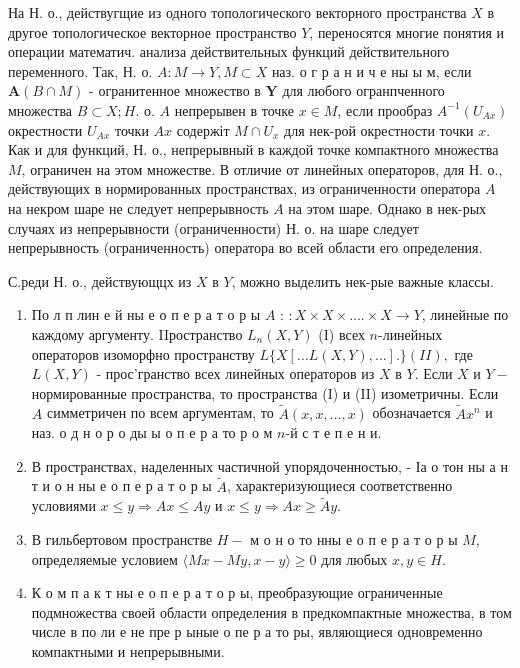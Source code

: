 \documentclass[10pt]{article}
\begin{document}
На Н. о., действугщие из одного топологического векторного пространства $X$ в другое топологическое векторное пространство $Y$, переносятся многие понятия и операции математич. анализа действительных функций действительного переменного. Так, Н. $о$. $A: M \rightarrow Y, M \subset X$ наз. о г р а н и ч е ны ы м, если $\boldsymbol{A}(B \cap M)$ - огранитенное множество в $\boldsymbol{Y}$ для любого огранпченного множества $B \subset X ; H$. о. $A$ непрерывен в точке $x \in M$, если прообраз $A^{-1}\left(U_{A x}\right)$ окрестности $U_{A x}$ точки $A x$ содержіт $M \cap U_{x}$ для нек-рой окрестности точки $x$. Как и для функций, Н. о., непрерывный в каждой точке компактного множества $M$, ограничен на этом множестве. В отличие от линейных операторов, для Н. о., действующих в нормированных пространствах, из ограниченности оператора $A$ на некром шаре не следует непрерывность $A$ на этом шаре. Однако в нек-рых случаях из непрерывности (ограниченности) Н. о. на шаре следует непрерывность (ограниченность) оператора во всей области его определения.



С.реди Н. о., действующцх из $X$ в $Y$, можно выделить нек-рые важные классы.



\begin{enumerate}

  \item По л п лин е й ны е о п е р а т о р ы $A$ : $: X \times X \times \ldots . \times X \rightarrow Y$, линейные по каждому аргументу. IIространство $L_{n}(X, Y)$ (I) всех $n$-линейных операторов изоморфно пространству $L\{X[\ldots L(X, Y), \ldots]$.$\} (II),$ где $L(X, Y)$ - прос'гранство всех линейных операторов из $X$ в $Y$. Если $X$ и $Y-$ нормированные пространства, то пространства (I) и (II) изометричны. Если $A$ симметричен по всем аргументам, то $\tilde{A}(x, x, \ldots, x)$ обозначается $\tilde{A} x^{n}$ и наз. о д н о р о ды ы о п е р а то р о м $n$-й с т е п е н и.



  \item В пространствах, наделенных частичной упорядоченностью, - Іа о тон ны а н т и о н ны е о п е р а т о р ы $\tilde{A}$, характеризующиеся соответственно условиями $x \leqslant y \Rightarrow A x \leqslant A y$ и $x \leqslant y \Rightarrow A x \geqslant \tilde{A} y$.



  \item В гильбертовом пространстве $H-$ м о н о то нны е о п е р а т о р ы $M$, определяемые условием $\langle M x-M y, x-y\rangle \geqslant 0$ для любых $x, y \in H$.



  \item К о м п а к т ны е о п е р а т о р ы, преобразующие ограниченные подмножества своей области определения в предкомпактные множества, в том числе в по ли е не пре р ыные о пе р а то ры, являющиеся одновременно компактными и непрерывными.



\end{enumerate}
\end{document}
